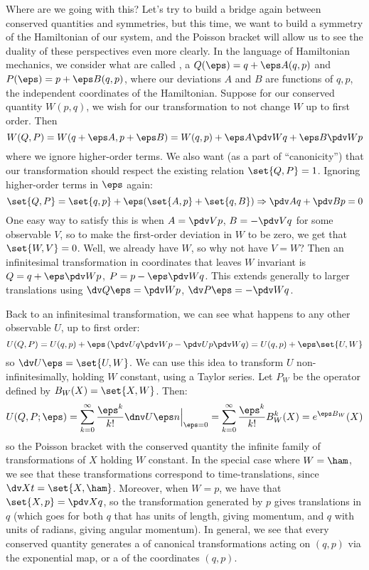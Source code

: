 \documentclass[12pt]{article}
\begin{document}
Where are we going with this? Let's try to build a bridge again between
conserved quantities and symmetries, but this time, we want to build a symmetry
of the Hamiltonian of our system, and the Poisson bracket will allow us to see
the duality of these perspectives even more clearly. In the language of
Hamiltonian mechanics, we consider what are called , a $Q(\eps) = q + \eps A(q, p)$ and $P(\eps) = p + \eps B(q,
p)$, where our deviations $A$ and $B$ are functions of $q, p$, the independent
coordinates of the Hamiltonian. Suppose for our conserved quantity $W(p, q)$, we
wish for our transformation to not change $W$ up to first order. Then 
\[
 W(Q,P) = W(q + \eps A, p + \eps B) = W(q, p) + \eps A \pdv W q + \eps B \pdv W
 p 
\] 
where we ignore higher-order terms. We also want (as a part of ``canonicity'')
that our transformation should respect the existing relation $\set{Q, P} = 1$.
Ignoring higher-order terms in $\eps$ again:  
\[
  \set{Q, P} = \set{q, p} + \eps ( \set{A, p} + \set{q, B}) \Rightarrow
  \pdv A q + \pdv B p = 0
\] 
One easy way to satisfy this is when $A = \pdv V p$, $B = - \pdv V q$ for some
observable $V$, so to make the first-order deviation in $W$ to be zero, we get
that $\set{W, V} = 0$. Well, we already have $W$, so why not have $V = W$? Then
an infinitesimal transformation in coordinates that leaves $W$ invariant is $Q =
q + \eps \pdv W p$, $P = p - \eps \pdv W q$. This extends generally to larger
translations using $\dv Q \eps = \pdv W p$, $\dv P \eps = - \pdv W
q$.

Back to an infinitesimal transformation, we can see what happens to any other observable
$U$, up to first order: 
\[
 U(Q, P) = U(q, p) + \eps \left(\pdv U q \pdv W p - \pdv U p \pdv W q \right) = U(q, p) +
 \eps\set{U, W}
\] 
so $\dv U \eps = \set{U, W}$. We can use this idea to transform $U$
non-infinitesimally, holding $W$ constant, using a Taylor series. Let $P_W$ be
the operator defined by $B_W(X) = \set{X, W}$. Then: 
\[
  U(Q, P; \eps) = \sum_{k=0}^\infty \frac{\eps^k}{k!} \dnv U \eps n \Big|_{\eps = 0} =
  \sum_{k=0}^\infty \frac{\eps^k}{k!} B_W^k(X) = e^{\eps B_W}(X)
\]
so the Poisson bracket with the conserved quantity  the infinite
family of transformations of $X$ holding $W$ constant. In the special case where
$W = \ham$, we see that these transformations correspond to time-translations,
since $\dv X t = \set{X, \ham}$. Moreover, when $W = p$, we have that
$\set{X, p} = \pdv X q$, so the transformation generated by $p$ gives
translations in $q$ (which goes for both $q$ that has units of length, giving
momentum, and $q$ with units of radians, giving angular momentum). In general,
we see that every conserved quantity generates a  of
canonical transformations acting on $(q, p)$ via the exponential map, or a
 of the coordinates $(q, p)$.  
\end{document}
